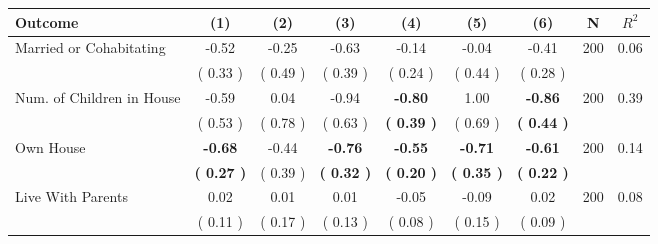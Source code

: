 \begin{tabular}{lcccccccc}
\toprule
 \textbf{Outcome} & \textbf{(1)} & \textbf{(2)} & \textbf{(3)} & \textbf{(4)} & \textbf{(5)} & \textbf{(6)} & \textbf{N} & \textbf{$ R^2$} \\
\midrule
Married or Cohabitating &     -0.52 &     -0.25 &     -0.63 &     -0.14 &     -0.04 &     -0.41 & 200 &       0.06 \\ 
 & (     0.33 ) & (     0.49 ) & (     0.39 ) & (     0.24 ) & (     0.44 ) & (     0.28 ) & \\
Num. of Children in House &     -0.59 &      0.04 &     -0.94 & \textbf{    -0.80} &      1.00 & \textbf{    -0.86} & 200 &       0.39 \\ 
 & (     0.53 ) & (     0.78 ) & (     0.63 ) & \textbf{(     0.39 )} & (     0.69 ) & \textbf{(     0.44 )} & \\
Own House & \textbf{    -0.68} &     -0.44 & \textbf{    -0.76} & \textbf{    -0.55} & \textbf{    -0.71} & \textbf{    -0.61} & 200 &       0.14 \\ 
 & \textbf{(     0.27 )} & (     0.39 ) & \textbf{(     0.32 )} & \textbf{(     0.20 )} & \textbf{(     0.35 )} & \textbf{(     0.22 )} & \\
Live With Parents &      0.02 &      0.01 &      0.01 &     -0.05 &     -0.09 &      0.02 & 200 &       0.08 \\ 
 & (     0.11 ) & (     0.17 ) & (     0.13 ) & (     0.08 ) & (     0.15 ) & (     0.09 ) & \\
\bottomrule
\end{tabular}
